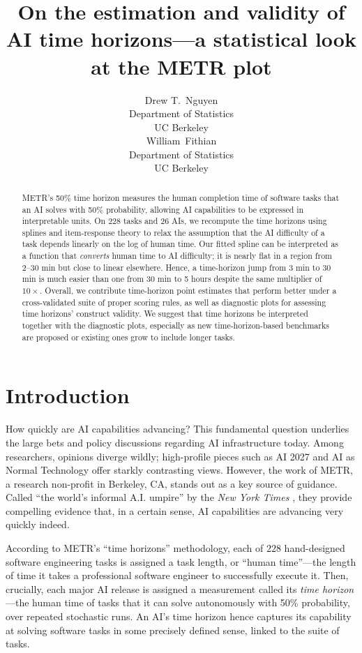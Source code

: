 \documentclass{article}
\title{On the estimation and validity of AI time horizons---a statistical look at the METR plot}
\author{%
  Drew T.~Nguyen \\
  Department of Statistics\\
  UC Berkeley\\
  \And
  William~Fithian \\
  Department of Statistics\\
  UC Berkeley\\
}
\theoremstyle{definition}
\begin{document}
\maketitle


\begin{abstract}
    METR's 50\% time horizon measures the human completion time of software tasks that an AI solves with 50\% probability, allowing AI capabilities to be expressed in interpretable units. On 228 tasks and 26 AIs, we recompute the time horizons using splines and item-response theory to relax the assumption that the AI difficulty of a task depends linearly on the log of human time. Our fitted spline can be interpreted as a function that \emph{converts} human time to AI difficulty; it is nearly flat in a region from 2--30 min but close to linear elsewhere. Hence, a time-horizon jump from 3 min to 30 min is much easier than one from 30 min to 5 hours despite the same multiplier of $10 \times$. Overall, we contribute time-horizon point estimates that perform better under a cross-validated suite of proper scoring rules, as well as diagnostic plots for assessing time horizons' construct validity. We suggest that time horizons be interpreted together with the diagnostic plots, especially as new time-horizon-based benchmarks are proposed or existing ones grow to include longer tasks. 
\end{abstract}



\section{Introduction}

How quickly are AI capabilities advancing? This fundamental question underlies the large bets and policy discussions regarding AI infrastructure today. Among researchers, opinions diverge wildly; high-profile pieces such as AI 2027 \citep{AI2027} and AI as Normal Technology \citep{AINormalTechnology} offer starkly contrasting views. However, the work of METR, a research non-profit in Berkeley, CA, stands out as a key source of guidance. Called ``the world's informal A.I. umpire'' by the \emph{New York Times} \citep{wittOpinionAIPrompt2025}, they provide compelling evidence that, in a certain sense, AI capabilities are advancing very quickly indeed. 

According to METR's ``time horizons'' methodology, each of $228$ hand-designed software engineering tasks is assigned a task length, or ``human time''---the length of time it takes a professional software engineer to successfully execute it. Then, crucially, each major AI release is assigned a measurement called its \emph{time horizon}---the human time of tasks that it can solve autonomously with 50\% probability, over repeated stochastic runs. An AI's time horizon hence captures its capability at solving software tasks in some precisely defined sense, linked to the suite of tasks.
\end{document}
